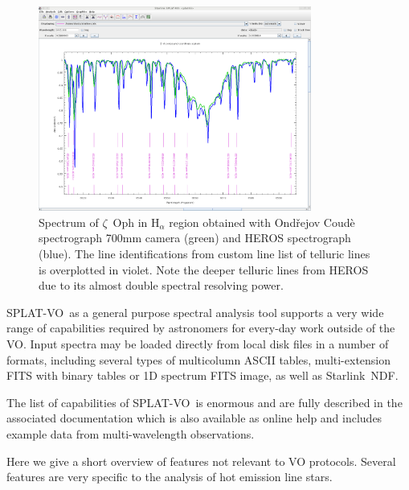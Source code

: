 \documentclass[final,authoryear,5p,times,twocolumn]{elsarticle}
\newcommand{\splatvo}{{\textsf{\small{SPLAT-VO}}}}
\newcommand{\Starlink}{\textsf{\small Starlink}}
\begin{document}
\begin{figure}[t]
\begin{center}
\includegraphics[width=0.8\textwidth]{zetoph2sp-id.pdf}
\caption{Spectrum of $\zeta$~Oph in H$_\alpha$ region  obtained with Ond\v{r}ejov Coud\`e
  spectrograph 700mm camera (green) and HEROS spectrograph (blue). The line
  identifications from custom line list of telluric lines is overplotted in violet. Note the deeper
  telluric lines from HEROS due to its almost double spectral resolving power.}
\label{fig:zetoph2sp-id}
\end{center}
\end{figure}

\splatvo\ as a general purpose spectral analysis tool supports a very wide
range of capabilities required by astronomers for every-day work outside of
the VO. Input spectra may be loaded directly from local disk files in a number
of formats, including several types of multicolumn ASCII tables,
multi-extension FITS with binary tables or 1D spectrum FITS image, as well as
\Starlink\ NDF.

The list of capabilities of \splatvo\ is enormous and are fully described in
the associated documentation \citep[SUN/243;][]{sun243} which is also
available as online help and includes example data from
multi-wavelength observations.

Here we give a short overview of features not relevant to VO protocols.
Several features are very specific to the analysis of hot emission
line stars.
\end{document}

